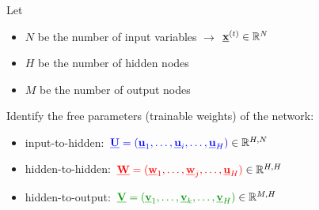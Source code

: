 \begin{frame}\frametitle{\subsubsecname}


Let
\begin{itemize}
\item[] $N$ be the number of input variables $\rightarrow$ $\underline{\mathbf{x}}^{(t)} \in \mathbb{R}^N$
\item[] $H$ be the number of hidden nodes
\item[] $M$ be the number of output nodes
\end{itemize}

\pause

Identify the free parameters (trainable weights) of the network:

\begin{itemize}
\item input-to-hidden: ${\color{blue} \underline{\mathbf{U}} = (\underline{\mathbf{u}}_1,\ldots, \underline{\mathbf{u}}_i, \ldots,\underline{\mathbf{u}}_H)} \in \mathbb{R}^{H,N}$
\item hidden-to-hidden: ${\color{red} \underline{\mathbf{W}} = (\underline{\mathbf{w}}_1,\ldots, \underline{\mathbf{w}}_j, \ldots,\underline{\mathbf{u}}_H)} \in \mathbb{R}^{H,H}$
\item hidden-to-output: ${\color{darkgreen} \vec V = (\vec v_1,\ldots, \vec v_k, \ldots,\vec v_H)} \in \R^{M,H}$
\end{itemize}




\end{frame}

